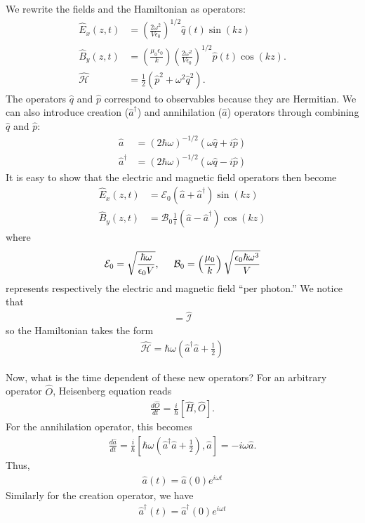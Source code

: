 \documentclass{book}
\theoremstyle{definition}
\newcommand{\ham}{\mathcal{H}}
\newcommand{\f}[2]{\frac{#1}{#2}}
\newcommand{\lp}{\left(}
\newcommand{\rp}{\right)}
\newcommand{\lb}{\left[}
\newcommand{\rb}{\right]}
\newcommand{\Id}{\mathcal{I}}
\begin{document}
We rewrite the fields and the Hamiltonian as operators:
\begin{align}
\hat{E}_x(z,t) &= \lp \f{2\omega^2}{V\epsilon_0} \rp^{1/2} \hat{q}(t)\sin(kz)\\
\hat{B}_y(z,t) &= \lp \f{\mu_0\epsilon_0}{k} \rp\lp \f{2\omega^2}{V\epsilon_0} \rp^{1/2}\hat{p}(t)\cos(kz).\\
\hat{\ham} &= \f{1}{2}\lp \hat{p}^2 + \omega^2\hat{q}^2 \rp.
\end{align}
The operators $\hat{q}$ and $\hat{p}$ correspond to observables because they are Hermitian. We can also introduce creation ($\hat{a}^\dagger$) and annihilation ($\hat{a}$) operators through combining $\hat{q}$ and $\hat{p}$:
\begin{align}
\hat{a} &= (2\hbar\omega)^{-1/2}(\omega\hat{q} + i\hat{p})\\
\hat{a}^\dagger &= (2\hbar\omega)^{-1/2}(\omega\hat{q} - i\hat{p})
\end{align}
It is easy to show that the electric and magnetic field operators then become
\begin{align}
\hat{E}_x(z,t) &= \mathcal{E}_0(\hat{a} + \hat{a}^\dagger)\sin(kz)\\
\hat{B}_y(z,t) &= \mathcal{B}_0\f{1}{i}(\hat{a} - \hat{a}^\dagger)\cos(kz)
\end{align}
where
\begin{align}
\mathcal{E}_0 = \sqrt{\f{\hbar\omega}{\epsilon_0 V}}, \hspace{0.5cm}
\mathcal{B}_0 = \lp\f{\mu_0}{k}\rp\sqrt{\f{\epsilon_0\hbar\omega^3}{V}}
\end{align}
represents respectively the electric and magnetic field ``per photon.'' We notice that
\begin{align}
[\hat{a}, \hat{a}^\dagger] = \hat{\Id}
\end{align}
so the Hamiltonian takes the form
\begin{align}
\boxed{\hat{\ham} = \hbar\omega\lp \hat{a}^\dagger\hat{a} + \f{1}{2} \rp}
\end{align}

Now, what is the time dependent of these new operators? For an arbitrary operator $\hat{O}$, Heisenberg equation reads
\begin{align}
\f{d\hat{O}}{dt} = \f{i}{\hbar}[\hat{H},\hat{O}].
\end{align}
For the annihilation operator, this becomes
\begin{align}
\f{d\hat{a}}{dt} = \f{i}{\hbar}\lb \hbar\omega\lp \hat{a}^\dagger\hat{a} + \f{1}{2} \rp, \hat{a} \rb = -i\omega \hat{a}.
\end{align}
Thus,
\begin{align}
\boxed{\hat{a}(t) = \hat{a}(0)e^{i\omega t}}
\end{align}
Similarly for the creation operator, we have
\begin{align}
\boxed{\hat{a}^\dagger(t) = \hat{a}^\dagger(0) e^{i\omega t}}
\end{align}
\end{document}
